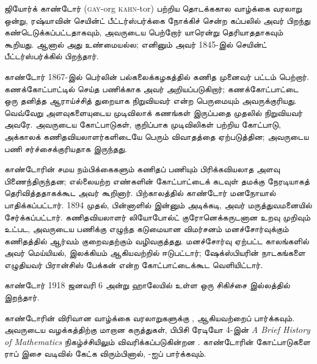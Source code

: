 \documentclass[../../../include/open-logic-section]{subfiles}
\begin{document}



ஜியோர்க் காண்டோர் (\textsc{gay}-org \textsc{kahn}-tor) பற்றிய தொடக்ககால
வாழ்க்கை வரலாறு ஒன்று, ரஷ்யாவின் செயின்ட் பீட்டர்ஸ்பர்க்கை நோக்கிச் சென்ற
கப்பலில் அவர் பிறந்து கண்டெடுக்கப்பட்டதாகவும், அவருடைய பெற்றோர் யாரென்று
தெரியாததாகவும் கூறியது. ஆனால் அது உண்மையல்ல; எனினும் அவர் 1845-இல்
செயின்ட் பீட்டர்ஸ்பர்க்கில் பிறந்தார்.

காண்டோர் 1867-இல் பெர்லின் பல்கலைக்கழகத்தில் கணித முனைவர் பட்டம் பெற்றார்.
கணக்கோட்பாட்டில் செய்த பணிக்காக அவர் அறியப்படுகிறார்; கணக்கோட்பாட்டை ஒரு
தனித்த ஆராய்ச்சித் துறையாக நிறுவியவர் என்ற பெருமையும் அவருக்குரியது.
வெவ்வேறு அளவுகளையுடைய முடிவிலாக் கணங்கள் இருப்பதை முதலில் நிறுவியவர் அவரே.
அவருடைய கோட்பாடுகள், குறிப்பாக முடிவிலிகள் பற்றிய கோட்பாடு, அக்காலக்
கணிதவியலாளர்களிடையே பெரும் விவாதத்தை ஏற்படுத்தின; அவருடைய பணி
சர்ச்சைக்குரியதாக இருந்தது.

காண்டோரின் சமய நம்பிக்கைகளும் கணிதப் பணியும் பிரிக்கவியலாத அளவு
பிணைந்திருந்தன; எல்லையற்ற எண்களின் கோட்பாட்டைக் கடவுள் தமக்கு நேரடியாகத்
தெரிவித்ததாகக்கூட அவர் கூறினார். பிற்காலத்தில் காண்டோர் மனநோயால்
பாதிக்கப்பட்டார். 1894 முதல், பின்னாளில் இன்னும் அடிக்கடி, அவர் மருத்துவமனையில்
சேர்க்கப்பட்டார். கணிதவியலாளர் லியோபோல்ட் குரோனெக்கருடனான உறவு முறிவும்
உட்பட, அவருடைய பணிக்கு எழுந்த கடுமையான விமர்சனம் மனச்சோர்வுக்கும் கணிதத்தில்
ஆர்வம் குறைவதற்கும் வழிவகுத்தது. மனச்சோர்வு ஏற்பட்ட காலங்களில் அவர்
மெய்யியல், இலக்கியம் ஆகியவற்றில் ஈடுபட்டார்; ஷேக்ஸ்பியரின் நாடகங்களை
எழுதியவர் பிரான்சிஸ் பேக்கன் என்ற கோட்பாட்டைக்கூட வெளியிட்டார்.

காண்டோர் 1918 ஜனவரி 6 அன்று ஹாலேயில் உள்ள ஒரு சிகிச்சை இல்லத்தில் இறந்தார்.

\begin{reading}
காண்டோரின் விரிவான வாழ்க்கை வரலாறுகளுக்கு \citet{Dauben1990},
\citet{Grattan-Guinness1971} ஆகியவற்றைப் பார்க்கவும். அவருடைய வழக்கத்திற்கு
மாறான கருத்துகள், பிபிசி ரேடியோ 4-இன் \emph{A Brief History of
  Mathematics} நிகழ்ச்சியிலும் விவரிக்கப்படுகின்றன \citep{Sautoy2014}.
காண்டோரின் கோட்பாடுகளை ராப் இசை வடிவில் கேட்க விரும்பினால்,
\citet{Rose2012}-ஐப் பார்க்கவும்.
\end{reading}
\end{document}
